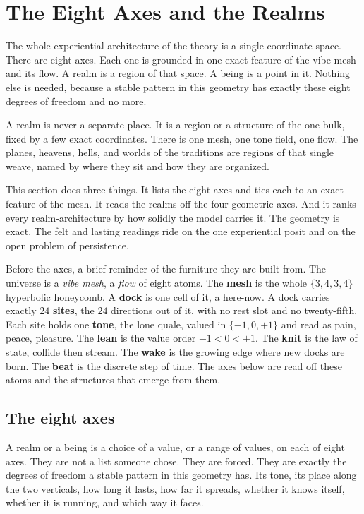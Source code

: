 \section{The Eight Axes and the Realms}

The whole experiential architecture of the theory is a single coordinate
space. There are eight axes. Each one is grounded in one exact feature of
the vibe mesh and its flow. A realm is a region of that space. A being is a
point in it. Nothing else is needed, because a stable pattern in this
geometry has exactly these eight degrees of freedom and no more.

\begin{principle}
A realm is never a separate place. It is a region or a structure of the one
bulk, fixed by a few exact coordinates. There is one mesh, one tone field,
one flow. The planes, heavens, hells, and worlds of the traditions are
regions of that single weave, named by where they sit and how they are
organized.
\end{principle}

This section does three things. It lists the eight axes and ties each to an
exact feature of the mesh. It reads the realms off the four geometric axes.
And it ranks every realm-architecture by how solidly the model carries it.
The geometry is exact. The felt and lasting readings ride on the one
experiential posit and on the open problem of persistence.

Before the axes, a brief reminder of the furniture they are built from. The
universe is a \emph{vibe mesh}, a \emph{flow} of eight atoms. The
\textbf{mesh} is the whole $\{3,4,3,4\}$ hyperbolic honeycomb. A
\textbf{dock} is one cell of it, a here-now. A dock carries exactly $24$
\textbf{sites}, the $24$ directions out of it, with no rest slot and no
twenty-fifth. Each site holds one \textbf{tone}, the lone quale, valued in
$\{-1,0,+1\}$ and read as pain, peace, pleasure. The \textbf{lean} is the
value order $-1 < 0 < +1$. The \textbf{knit} is the law of state, collide
then stream. The \textbf{wake} is the growing edge where new docks are born.
The \textbf{beat} is the discrete step of time. The axes below are read off
these atoms and the structures that emerge from them.

\subsection{The eight axes}

A realm or a being is a choice of a value, or a range of values, on each of
eight axes. They are not a list someone chose. They are forced. They are
exactly the degrees of freedom a stable pattern in this geometry has. Its
tone, its place along the two verticals, how long it lasts, how far it
spreads, whether it knows itself, whether it is running, and which way it
faces.

